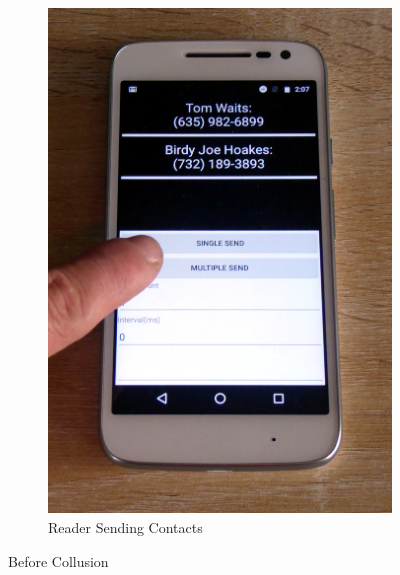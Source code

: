 \begin{figure}[H]
\begin{subfigure}{0.49\textwidth}
		\includegraphics[height=0.45\textheight]{graphics/PhonePhotos/07 - ReaderSend.jpg}
		\caption{Reader Sending Contacts}
		\label{fig:ReaderSend}
	\end{subfigure}
	\caption{Before Collusion}
	\label{fig:BeforeCollusion}
\end{figure}

\newpage

